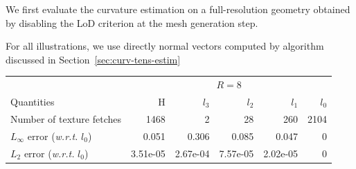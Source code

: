 \documentclass{llncs}
\newcommand{\wrt}{\emph{w.r.t.} }
\begin{document}
We first evaluate the curvature estimation on a full-resolution
geometry obtained by disabling the LoD criterion at the mesh
generation step.

For all illustrations, we use directly normal vectors computed by algorithm
discussed in Section~\ref{sec:curv-tens-estim}

\begin{table}
  \begin{center}

	\begin{tabular}{@{}lrrrrr@{}}
      \toprule
      & \multicolumn{5}{c}{$R=8$}\\
      \cmidrule(r){2-6}
    Quantities & ~~~H & $l_3$ & $l_2$ & $l_1$ & $l_0$\\
      \midrule
      Number of texture fetches &
      1468 & 2 & 28 & 260 & 2104\\
      $L_\infty$ error (\wrt $l_0$) &
      0.051 & 0.306 & 0.085 & 0.047 & 0\\
      $L_2$ error (\wrt $l_0$) &
      3.51e-05 & 2.67e-04 & 7.57e-05 & 2.02e-05 & 0\\
      \bottomrule
    \end{tabular}


\end{center}
\end{table}
\end{document}

